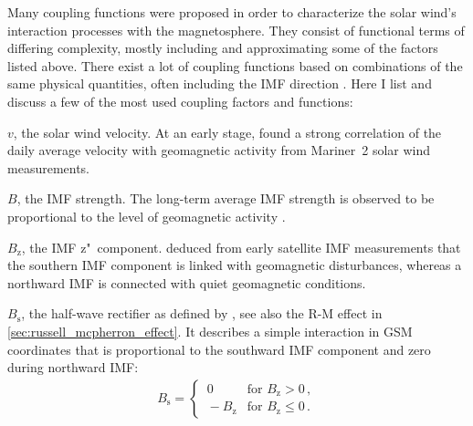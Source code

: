 Many coupling functions were proposed in order to characterize the solar wind's interaction processes with the magnetosphere. They consist of functional terms of differing complexity, mostly including and approximating some of the factors listed above. There exist a lot of coupling functions based on combinations of the same physical quantities, often including the IMF direction \citep{Newell2007,Lockwood2013}. Here I list and discuss a few of the most used coupling factors and functions:
\begin{itemize*}
	\item $v$, the solar wind velocity. At an early stage, \citet{Snyder1963} found a strong correlation of the daily average velocity with geomagnetic activity from Mariner~2 solar wind measurements.
	
	\item $B$, the IMF strength. The long-term average IMF strength is observed to be proportional to the level of geomagnetic activity \citep{Stamper1999,Lockwood2013}.
	
	\item $B_\text{z}$, the IMF z"~component. \citet{Fairfield1966} deduced from early satellite IMF measurements that the southern IMF component is linked with geomagnetic disturbances, whereas a northward IMF is connected with quiet geomagnetic conditions.
	
	\item $B_\text{s}$, the half-wave rectifier as defined by \citet{Russell1973}, see also the R-M effect in \autoref{sec:russell_mcpherron_effect}. It describes a simple interaction in GSM coordinates that is proportional to the southward IMF component and zero during northward IMF:
	\begin{align}
		B_\text{s} =
		\begin{cases}
			\,0 &\text{for } B_\text{z} > 0	\,,\\
			\,-B_\text{z} &\text{for } B_\text{z} \le 0	\,.
		\end{cases}	\label{eq:half_wave_rectifier}
	\end{align}
	

\end{itemize*}
